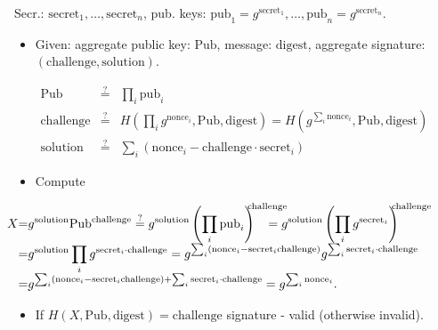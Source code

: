 \begin{frame}
Secr.: $\mathrm{secret}_1, \dots, \mathrm{secret}_n$, pub. keys: $\mathrm{pub}_1 = g^{ \mathrm{secret }_1 }, \dots, \mathrm{pub}_n= g^{\mathrm{secret}_n}$.

\begin{emptyTheorem}
\begin{itemize}
\item Given: aggregate public key: $\mathrm{Pub} $, message: $\mathrm{digest}$, aggregate signature: $(\mathrm{challenge}, \mathrm{solution})$.

\vskip -0.25cm
\hfil\hfil$
\begin{array}{rcl}
\mathrm{Pub}&\stackrel{?}{=}& \prod_i \mathrm{pub}_i\\
\mathrm{challenge} &\stackrel{?}{=}& H\left( \prod_i g^{\mathrm{nonce}_i}, \mathrm{Pub}, \mathrm{digest} \right) = H\left( g^{\sum_i \mathrm{nonce}_i}, \mathrm{Pub}, \mathrm{digest} \right)  \\
\mathrm{solution} &\stackrel{?}{=}& \sum _i \left(\mathrm{nonce}_i - \mathrm{challenge}\cdot \mathrm{secret}_i \right)
\end{array}
$
\item Compute

\noindent $\hskip -1cm
\begin{array}{r@{}c@{}l} 
X&{=}&\displaystyle g^{\mathrm{solution} } \mathrm{Pub}^{\mathrm{challenge}}\stackrel{?}{=} \displaystyle g^{\mathrm{solution}} \left(\prod_i \mathrm{pub}_i\right)^{\!\!\!\!\mathrm{challenge}} 
\!\!\!\!\!\!\!\!\!\!\! =\displaystyle  g^{\mathrm{solution}} \left(\prod_i g^{\mathrm{secret}_i}\right)^{\!\!\!\!\mathrm{challenge}}\\
&=&\displaystyle g^{\mathrm{solution}}\prod_i g^{\mathrm{secret}_i\cdot \mathrm{challenge}}= \displaystyle g^{\sum_i \left(\mathrm{nonce}_i - \mathrm{secret}_i\mathrm{challenge}\right)} g^ { \sum_i \mathrm{secret}_i\cdot \mathrm{challenge} }\\
&=&\displaystyle g^{\sum_i \left(\mathrm{nonce}_i - \mathrm{secret}_i\mathrm{challenge}\right)+ \sum_i \mathrm{secret}_i\cdot \mathrm{challenge} }=g^{\sum_i\mathrm{nonce}_i}.
\end{array}
$
\item If $H\left(X, \mathrm{Pub}, \mathrm{digest}\right) = \mathrm{challenge}$  signature - valid (otherwise invalid).
\end{itemize}
\end{emptyTheorem}

\vskip 15cm
\end{frame}